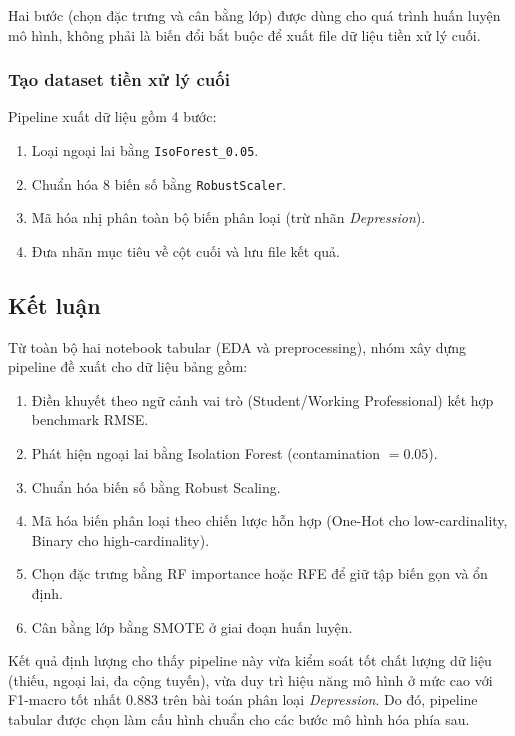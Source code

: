 Hai bước (chọn đặc trưng và cân bằng lớp) được dùng cho quá trình huấn luyện mô hình, không phải là biến đổi bắt buộc để xuất file dữ liệu tiền xử lý cuối.

\subsubsection{Tạo dataset tiền xử lý cuối}
Pipeline xuất dữ liệu gồm 4 bước:
\begin{enumerate}
    \item Loại ngoại lai bằng \texttt{IsoForest\_0.05}.
    \item Chuẩn hóa 8 biến số bằng \texttt{RobustScaler}.
    \item Mã hóa nhị phân toàn bộ biến phân loại (trừ nhãn \textit{Depression}).
    \item Đưa nhãn mục tiêu về cột cuối và lưu file kết quả.
\end{enumerate}


\subsection{Kết luận}
Từ toàn bộ hai notebook tabular (EDA và preprocessing), nhóm xây dựng pipeline đề xuất cho dữ liệu bảng gồm:
\begin{enumerate}
    \item Điền khuyết theo ngữ cảnh vai trò (Student/Working Professional) kết hợp benchmark RMSE.
    \item Phát hiện ngoại lai bằng Isolation Forest (contamination $=0.05$).
    \item Chuẩn hóa biến số bằng Robust Scaling.
    \item Mã hóa biến phân loại theo chiến lược hỗn hợp (One-Hot cho low-cardinality, Binary cho high-cardinality).
    \item Chọn đặc trưng bằng RF importance hoặc RFE để giữ tập biến gọn và ổn định.
    \item Cân bằng lớp bằng SMOTE ở giai đoạn huấn luyện.
\end{enumerate}

Kết quả định lượng cho thấy pipeline này vừa kiểm soát tốt chất lượng dữ liệu (thiếu, ngoại lai, đa cộng tuyến), vừa duy trì hiệu năng mô hình ở mức cao với F1-macro tốt nhất 0.883 trên bài toán phân loại \textit{Depression}. Do đó, pipeline tabular được chọn làm cấu hình chuẩn cho các bước mô hình hóa phía sau.
